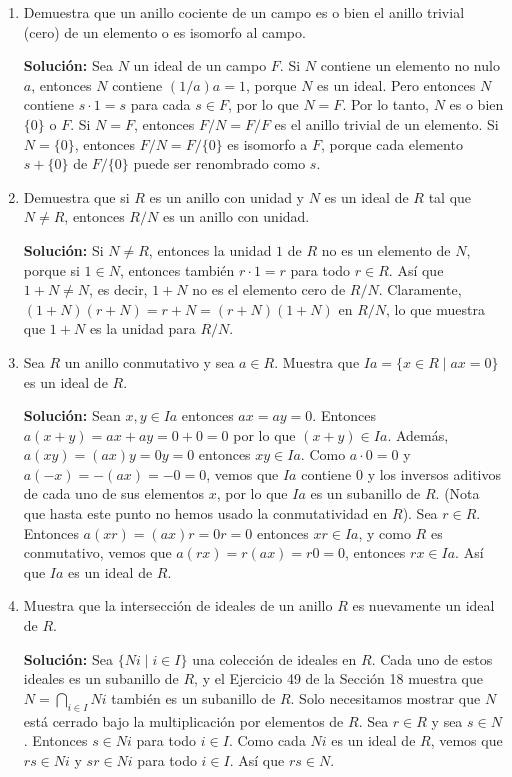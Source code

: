 \begin{enumerate}
\item Demuestra que un anillo cociente de un campo es o bien el anillo trivial (cero) de un elemento o es isomorfo al campo.

\textbf{Solución:}
Sea \( N \) un ideal de un campo \( F \). Si \( N \) contiene un elemento no nulo \( a \), entonces \( N \) contiene \( (1/a)a = 1 \), porque \( N \) es un ideal. Pero entonces \( N \) contiene \( s \cdot 1 = s \) para cada \( s \in F \), por lo que \( N = F \). Por lo tanto, \( N \) es o bien \( \{0\} \) o \( F \). Si \( N = F \), entonces \( F/N = F/F \) es el anillo trivial de un elemento. Si \( N = \{0\} \), entonces \( F/N = F/\{0\} \) es isomorfo a \( F \), porque cada elemento \( s + \{0\} \) de \( F/\{0\} \) puede ser renombrado como \( s \).

\item  Demuestra que si \( R \) es un anillo con unidad y \( N \) es un ideal de \( R \) tal que \( N \neq R \), entonces \( R/N \) es un anillo con unidad.

\textbf{Solución:}
Si \( N \neq R \), entonces la unidad \( 1 \) de \( R \) no es un elemento de \( N \), porque si \( 1 \in N \), entonces también \( r \cdot 1 = r \) para todo \( r \in R \). Así que \( 1 + N \neq N \), es decir, \( 1 + N \) no es el elemento cero de \( R/N \). Claramente, \( (1 + N)(r + N) = r + N = (r + N)(1 + N) \) en \( R/N \), lo que muestra que \( 1 + N \) es la unidad para \( R/N \).

\item Sea $R$ un anillo conmutativo y sea $a \in R$. Muestra que $Ia = \{x \in R \mid ax = 0\}$ es un ideal de $R$.

\textbf{Solución:}
 Sean $x, y \in Ia$ entonces $ax = ay = 0$. Entonces $a(x + y) = ax + ay = 0 + 0 = 0$ por lo que $(x + y) \in Ia$. Además, $a(xy) = (ax)y = 0y = 0$ entonces $xy \in Ia$. Como $a \cdot 0 = 0$ y $a(-x) = -(ax) = -0 = 0$, vemos que $Ia$ contiene $0$ y los inversos aditivos de cada uno de sus elementos $x$, por lo que $Ia$ es un subanillo de $R$. (Nota que hasta este punto no hemos usado la conmutatividad en $R$). Sea $r \in R$. Entonces $a(xr) = (ax)r = 0r = 0$ entonces $xr \in Ia$, y como $R$ es conmutativo, vemos que $a(rx) = r(ax) = r0 = 0$, entonces $rx \in Ia$. Así que $Ia$ es un ideal de $R$.

\item Muestra que la intersección de ideales de un anillo $R$ es nuevamente un ideal de $R$.

\textbf{Solución:}
Sea $\{Ni \mid i \in I\}$ una colección de ideales en $R$. Cada uno de estos ideales es un subanillo de $R$, y el Ejercicio 49 de la Sección 18 muestra que $N = \bigcap_{i \in I} Ni$ también es un subanillo de $R$. Solo necesitamos mostrar que $N$ está cerrado bajo la multiplicación por elementos de $R$. Sea $r \in R$ y sea $s \in N$. Entonces $s \in Ni$ para todo $i \in I$. Como cada $Ni$ es un ideal de $R$, vemos que $rs \in Ni$ y $sr \in Ni$ para todo $i \in I$. Así que $rs \in N$.


\end{enumerate}
